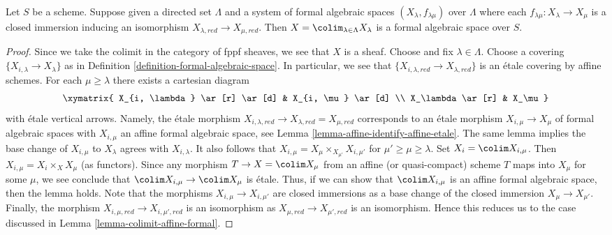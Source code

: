 \begin{lemma}
\label{lemma-colimit-formal-spaces-is-formal-space}
Let $S$ be a scheme. Suppose given a directed set
$\Lambda$ and a system of formal algebraic spaces
$(X_\lambda, f_{\lambda \mu})$ over $\Lambda$ where each
$f_{\lambda \mu} : X_\lambda \to X_\mu$ is a closed immersion
inducing an isomorphism $X_{\lambda, red} \to X_{\mu, red}$.
Then $X = \colim_{\lambda \in \Lambda} X_\lambda$
is a formal algebraic space over $S$.
\end{lemma}

\begin{proof}
Since we take the colimit in the category of fppf sheaves, we
see that $X$ is a sheaf. Choose and fix $\lambda \in \Lambda$. Choose
a covering $\{X_{i, \lambda} \to X_\lambda\}$ as in Definition
\ref{definition-formal-algebraic-space}. In particular, we see
that $\{X_{i, \lambda, red} \to X_{\lambda, red}\}$ is an
\'etale covering by affine schemes.
For each $\mu \geq \lambda$ there exists a cartesian diagram
$$
\xymatrix{
X_{i, \lambda} \ar[r] \ar[d] & X_{i, \mu} \ar[d] \\
X_\lambda \ar[r] & X_\mu
}
$$
with \'etale vertical arrows. Namely, the \'etale morphism
$X_{i, \lambda, red} \to X_{\lambda, red} = X_{\mu, red}$
corresponds to an \'etale morphism $X_{i, \mu} \to X_\mu$
of formal algebraic spaces with $X_{i, \mu}$ an affine formal
algebraic space, see
Lemma \ref{lemma-affine-identify-affine-etale}.
The same lemma implies the base change of $X_{i, \mu}$ to $X_\lambda$
agrees with $X_{i, \lambda}$. It also follows that
$X_{i, \mu} = X_\mu \times_{X_{\mu'}} X_{i, \mu'}$ for
$\mu' \geq \mu \geq \lambda$. Set $X_i = \colim X_{i, \mu}$.
Then $X_{i, \mu} = X_i \times_X X_\mu$ (as functors).
Since any morphism $T \to X = \colim X_\mu$
from an affine (or quasi-compact) scheme $T$ maps into $X_\mu$
for some $\mu$, we see conclude that
$\colim X_{i, \mu} \to \colim X_\mu$ is \'etale.
Thus, if we can show that $\colim X_{i, \mu}$ is an affine formal
algebraic space, then the lemma holds.
Note that the morphisms $X_{i, \mu} \to X_{i, \mu'}$
are closed immersions as a base change of the closed immersion
$X_\mu \to X_{\mu'}$. Finally, the morphism
$X_{i, \mu, red} \to X_{i, \mu', red}$ is an isomorphism
as $X_{\mu, red} \to X_{\mu', red}$ is an isomorphism.
Hence this reduces us to the case discussed in
Lemma \ref{lemma-colimit-affine-formal}.
\end{proof}








